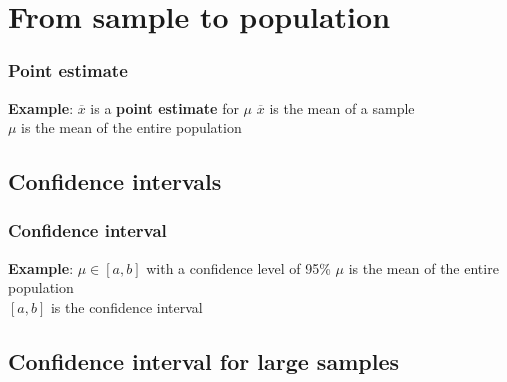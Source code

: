 \documentclass{beamer}
\begin{document}
\section{From sample to population}
\sectionframelogo{}

\begin{frame}
  \frametitle{Point estimate}
\vfill
  \textbf{Example}: $\overline{x}$ is a \textbf{point estimate} for $\mu$
\vfill
  $\overline{x}$ is the mean of a sample\\
  $\mu$ is the mean of the entire population
\end{frame}

\subsection{Confidence intervals}

\begin{frame}
  \frametitle{Confidence interval}
\vfill
\textbf{Example}: $\mu \in [a,b]$ with a confidence level of 95\%
\vfill
  $\mu$ is the mean of the entire population\\
  $[a,b]$ is the confidence interval
\end{frame}

\subsection{Confidence interval for large samples}
\end{document}
